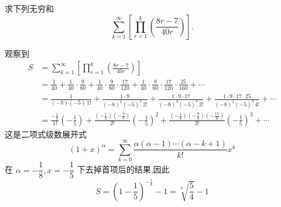 \begin{questions}
    \question 求下列无穷和
    \[
    \sum_{k=1}^{\infty}\left[\prod_{r=1}^{k}\left(\frac{8r-7}{40r}\right)\right].
    \]
    \begin{solution}
        观察到
        \begin{align*}
        S&=\sum_{k=1}^{\infty}\left[\prod_{r=1}^{k}\left(\frac{8r-7}{40r}\right)\right] \\
        &= \frac{1}{40}
        + \frac{1}{40}\cdot\frac{9}{80}
        + \frac{1}{40}\cdot\frac{9}{80}\cdot\frac{17}{120}
        + \frac{1}{40}\cdot\frac{9}{80}\cdot\frac{17}{120}\cdot\frac{25}{160}
        + \cdots \\
        &= \frac{1}{(-8)(-5)\,1!}
        + \frac{1\cdot 9}{(-8)^2(-5)^2\,2!}
        + \frac{1\cdot 9\cdot 17}{(-8)^3(-5)^3\,3!}
        + \frac{1\cdot 9\cdot 17\cdot 25}{(-8)^4(-5)^4\,4!}
        + \cdots \\
        &= \frac{-\frac{1}{8}}{1!}\left(-\frac{1}{5}\right)
        + \frac{\left(-\frac{1}{8}\right)\left(-\frac{9}{8}\right)}{2!}\left(-\frac{1}{5}\right)^2 + \frac{\left(-\frac{1}{8}\right)\left(-\frac{9}{8}\right)\left(-\frac{17}{8}\right)}{3!}\left(-\frac{1}{5}\right)^3
        + \cdots 
        \end{align*}
        这是二项式级数展开式
        \[
        (1+x)^{\alpha}
        = \sum_{k=0}^{\infty}\frac{\alpha(\alpha-1)\cdots(\alpha-k+1)}{k!}x^k
        \]
        在 \(\alpha=-\dfrac{1}{8},x=-\dfrac{1}{5}\) 下去掉首项后的结果,因此
        \[
        S= \left(1-\frac{1}{5}\right)^{-\frac{1}{8}} - 1 = \sqrt[8]{\frac{5}{4}} - 1
        \]
    \end{solution}


\end{questions}
